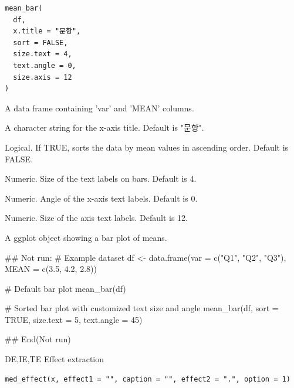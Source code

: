 \documentclass[a4paper]{book}
\begin{document}
%
\begin{Usage}
\begin{verbatim}
mean_bar(
  df,
  x.title = "문항",
  sort = FALSE,
  size.text = 4,
  text.angle = 0,
  size.axis = 12
)
\end{verbatim}
\end{Usage}
%
\begin{Arguments}
\begin{ldescription}
\item[\code{df}] A data frame containing 'var' and 'MEAN' columns.

\item[\code{x.title}] A character string for the x-axis title. Default is "문항".

\item[\code{sort}] Logical. If TRUE, sorts the data by mean values in ascending order. Default is FALSE.

\item[\code{size.text}] Numeric. Size of the text labels on bars. Default is 4.

\item[\code{text.angle}] Numeric. Angle of the x-axis text labels. Default is 0.

\item[\code{size.axis}] Numeric. Size of the axis text labels. Default is 12.
\end{ldescription}
\end{Arguments}
%
\begin{Value}
A ggplot object showing a bar plot of means.
\end{Value}
%
\begin{Examples}
\begin{ExampleCode}
## Not run: 
# Example dataset
df <- data.frame(var = c("Q1", "Q2", "Q3"), MEAN = c(3.5, 4.2, 2.8))

# Default bar plot
mean_bar(df)

# Sorted bar plot with customized text size and angle
mean_bar(df, sort = TRUE, size.text = 5, text.angle = 45)

## End(Not run)
\end{ExampleCode}
\end{Examples}
%
\begin{Description}
DE,IE,TE Effect extraction
\end{Description}
%
\begin{Usage}
\begin{verbatim}
med_effect(x, effect1 = "", caption = "", effect2 = ".", option = 1)
\end{verbatim}
\end{Usage}
\end{document}
